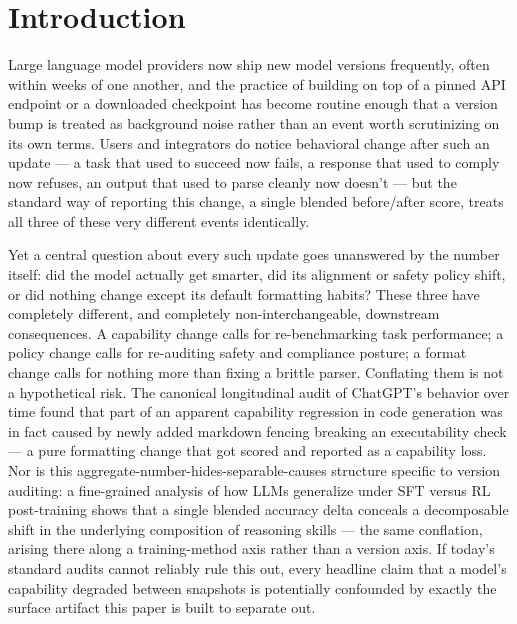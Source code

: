 \documentclass[11pt]{article}
\begin{document}
\section{Introduction}

Large language model providers now ship new model versions frequently, often within weeks of one another, and the practice of building on top of a pinned API endpoint or a downloaded checkpoint has become routine enough that a version bump is treated as background noise rather than an event worth scrutinizing on its own terms. Users and integrators do notice behavioral change after such an update --- a task that used to succeed now fails, a response that used to comply now refuses, an output that used to parse cleanly now doesn't --- but the standard way of reporting this change, a single blended before/after score, treats all three of these very different events identically.

Yet a central question about every such update goes unanswered by the number itself: did the model actually get smarter, did its alignment or safety policy shift, or did nothing change except its default formatting habits? These three have completely different, and completely non-interchangeable, downstream consequences. A capability change calls for re-benchmarking task performance; a policy change calls for re-auditing safety and compliance posture; a format change calls for nothing more than fixing a brittle parser. Conflating them is not a hypothetical risk. The canonical longitudinal audit of ChatGPT's behavior over time \citep{ChatGPTBehavior2307} found that part of an apparent capability regression in code generation was in fact caused by newly added markdown fencing breaking an executability check --- a pure formatting change that got scored and reported as a capability loss. Nor is this aggregate-number-hides-separable-causes structure specific to version auditing: a fine-grained analysis of how LLMs generalize under SFT versus RL post-training shows that a single blended accuracy delta conceals a decomposable shift in the underlying composition of reasoning skills \citep{HowandWhyLLMsGeneralizeA4063} --- the same conflation, arising there along a training-method axis rather than a version axis. If today's standard audits cannot reliably rule this out, every headline claim that a model's capability degraded between snapshots is potentially confounded by exactly the surface artifact this paper is built to separate out.
\end{document}
